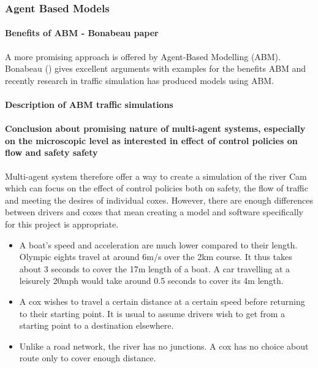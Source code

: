     \subsubsection{Agent Based Models}
    \paragraph{Benefits of ABM - Bonabeau paper}
      A more promising approach is offered by Agent-Based Modelling (ABM). Bonabeau (\cite{Bonabeau2002}) gives excellent arguments with examples for the benefits ABM and recently research in traffic simulation has produced models using ABM.
      
      \paragraph{Description of ABM traffic simulations}

          
    \paragraph{Conclusion about promising nature of multi-agent systems, especially on the  microscopic level as interested in effect of control policies on flow and safety safety}
    Multi-agent system therefore offer a way to create a simulation of the river Cam which can focus on the effect of control policies both on safety, the flow of traffic and meeting the desires of individual coxes. However, there are enough differences between drivers and coxes that mean creating a model and software specifically for this project is appropriate.
    
      \begin{itemize}
        \item A boat's speed and acceleration are much lower compared to their length. Olympic eights travel at around 6m/s over the 2km course. It thus takes about 3 seconds to cover the 17m length of a boat. A car travelling at a leisurely 20mph would take around 0.5 seconds to cover its 4m length.
        
        \item A cox wishes to travel a certain distance at a certain speed before returning to their starting point. It is usual to assume drivers wish to get from a starting point to a destination elsewhere. 
        
        \item Unlike a road network, the river has no junctions. A cox has no choice about route only to cover enough distance.
      \end{itemize}
  
